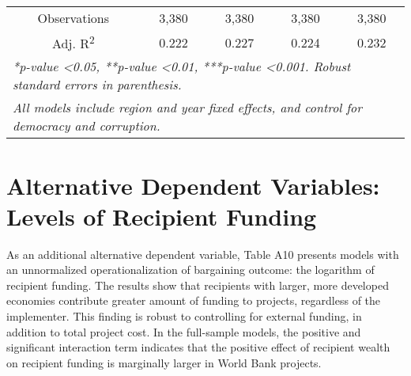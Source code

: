 \documentclass{article}
\begin{document}
\begin{singlespace}
\begin{table}[H]
{\begin{tabular}{ccccc}
				Observations & 3,380 & 3,380 & 3,380 & 3,380 \\
				Adj. R\textsuperscript{2} & 0.222 & 0.227 & 0.224 & 0.232 \\ \hline
				\multicolumn{5}{l}{\textit{*p-value \textless 0.05, **p-value \textless 0.01, ***p-value \textless 0.001.  Robust standard errors in parenthesis.}} \\
				\multicolumn{5}{l}{\textit{All models include region and year fixed effects, and control for democracy and corruption.}}
		\end{tabular}%
	}
\end{table}
\end{singlespace}	

\section{Alternative Dependent Variables: Levels of Recipient Funding}
As an additional alternative dependent variable, Table A10 presents models with an unnormalized operationalization of bargaining outcome: the logarithm of recipient funding.  The results show that recipients with larger, more developed economies contribute greater amount of funding to projects, regardless of the implementer.  This finding is robust to controlling for external funding, in addition to total project cost. In the full-sample models, the positive and significant interaction term indicates that the positive effect of recipient wealth on recipient funding is marginally larger in World Bank projects.       

\end{document}
